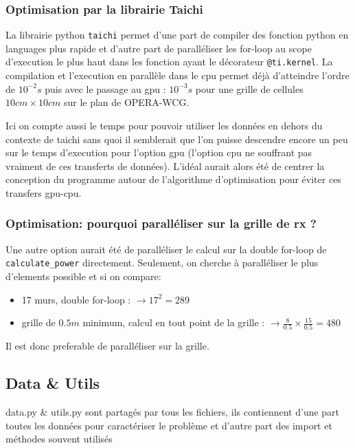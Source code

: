 \documentclass[sn-mathphys-num]{sn-jnl}%
\theoremstyle{thmstyleone}%
\theoremstyle{thmstyletwo}%
\theoremstyle{thmstylethree}%
\begin{document}
\subsubsection{Optimisation par la librairie Taichi}
La librairie python \texttt{taichi} permet d'une part de compiler des fonction
python en languages plus rapide et d'autre part de paralléliser
les for-loop au scope d'execution le plus haut dans les fonction ayant le décorateur
\texttt{@ti.kernel}. La compilation et l'execution en parallèle dans le cpu permet
déjà d'atteindre l'ordre de $10^{-2}s$ puis avec le passage au gpu : $10^{-3}s$ pour une grille
de cellules $10cm\times10cm$ sur le plan de OPERA-WCG.

Ici on compte aussi le temps pour pouvoir utiliser les données en dehors du contexte de taichi
sans quoi il semblerait que l'on puisse descendre encore un peu sur le
temps d'execution pour l'option gpu (l'option cpu ne souffrant pas vraiment de ces transferts de données).
L'idéal aurait alors été de centrer la conception du programme autour de l'algorithme d'optimisation
pour éviter ces transfers gpu-cpu.

\subsubsection{Optimisation: pourquoi paralléliser sur la grille de rx ?}
Une autre option aurait été de paralléliser le calcul sur la double for-loop de \texttt{calculate\_power} directement.
Seulement, on cherche à paralléliser le plus d'elements possible et si on compare:
\begin{itemize}
    \item 17 murs, double for-loop : $\rightarrow 17^2 = 289$
    \item grille de $0.5m$ minimum, calcul en tout point de la grille : $\rightarrow \frac{8}{0.5} \times \frac{15}{0.5} = 480$
\end{itemize}

Il est donc preferable de paralléliser sur la grille.





\subsection{Data \& Utils}
data.py \& utils.py sont partagés par tous les fichiers, 
ils contiennent d'une part toutes les données pour
caractériser le problème et d'autre part des import et méthodes souvent utilisés
\end{document}
